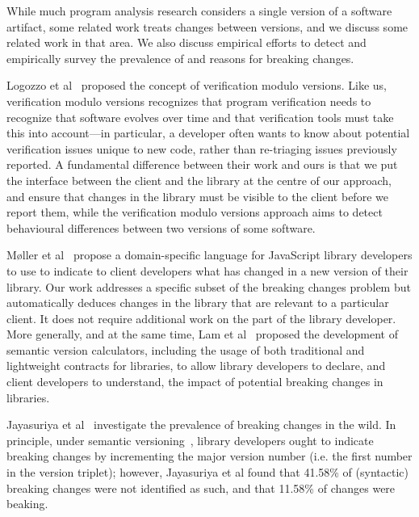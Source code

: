 While much program analysis research considers a single version of a software artifact, some related work treats changes between versions, and we discuss some related work in that area. We also discuss empirical efforts to detect and empirically survey the prevalence of and reasons for breaking changes.

Logozzo et al~\cite{logozzo14:_verif_modul_version} proposed the concept of verification modulo versions. Like us, verification modulo versions recognizes that program verification needs to recognize that software evolves over time and that verification tools must take this into account---in particular, a developer often wants to know about potential verification issues unique to new code, rather than re-triaging issues previously reported. A fundamental difference between their work and ours is that we put the interface between the client and the library at the centre of our approach, and ensure that changes in the library must be visible to the client before we report them, while the verification modulo versions approach aims to detect behavioural differences between two versions of some software.

Møller et al~\cite{møller20:_detec_locat_javas_progr_affec} propose a domain-specific language for JavaScript library developers to use to indicate to client developers what has changed in a new version of their library. Our work addresses a specific subset of the breaking changes problem but automatically deduces changes in the library that are relevant to a particular client. It does not require additional work on the part of the library developer. More generally, and at the same time, Lam et al~\cite{lam20:_puttin_seman_seman_version} proposed the development of semantic version calculators, including the usage of both traditional and lightweight contracts for libraries, to allow library developers to declare, and client developers to understand, the impact of potential breaking changes in libraries.

Jayasuriya et al~\cite{jayasuriya23:_under_break_chang_wild,jayasuriya24} investigate the prevalence of breaking changes in the wild. In principle, under semantic versioning~\cite{preston-werner23:_seman_version}, library developers ought to indicate breaking changes by incrementing the major version number (i.e. the first number in the version triplet); however, Jayasuriya et al found that 41.58\% of (syntactic) breaking changes were not identified as such, and that 11.58\% of changes were beaking.

